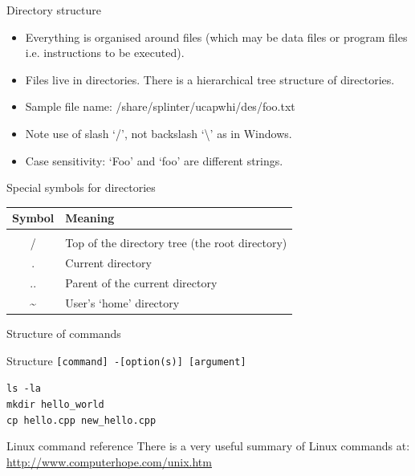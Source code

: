 \documentclass{beamer}
\begin{document}
\begin{frame}{Directory structure}
  \begin{itemize}
    \item{Everything is organised around files (which may be data files or program files i.e. instructions to be executed).}
    \item{Files live in directories. There is a hierarchical tree structure of directories.}
    \item{Sample file name: /share/splinter/ucapwhi/des/foo.txt}
    \item{Note use of slash `/', not backslash `\textbackslash' as in Windows.}
    \item{Case sensitivity: `Foo' and `foo' are different strings.}
  \end{itemize}
\end{frame}

\begin{frame}{Special symbols for directories}
  \begin{table}[ht]
    \centering
    \begin{tabular}{c l}
      \\ [-2ex]
      Symbol & Meaning \\ [.5ex]
      \hline \\ [-2ex]
      / & Top of the directory tree (the root directory) \\
      . & Current directory \\
      .. & Parent of the current directory \\
      \textasciitilde & User's `home' directory
    \end{tabular}
  \end{table}
\end{frame}

\begin{frame}{Structure of commands}
  \begin{block}{Structure}
    \texttt{[command] -[option(s)] [argument]}
  \end{block}
  \begin{Examples}
     \texttt{ls -la \\
     mkdir hello\_world \\
     cp hello.cpp new\_hello.cpp} \\
  \end{Examples}
\end{frame}

\begin{frame}{Linux command reference}
There is a very useful summary of Linux commands at: \\
\url{http://www.computerhope.com/unix.htm}
\end{frame}
\end{document}
